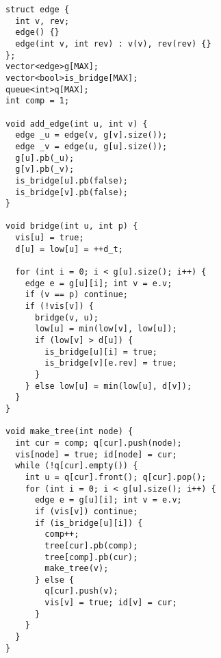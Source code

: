 \documentclass[10pt,a4paper,onesided]{article}
\begin{document}
\begin{multicols*}{3}
\begin{lstlisting}
struct edge {
  int v, rev;
  edge() {}
  edge(int v, int rev) : v(v), rev(rev) {}
};
vector<edge>g[MAX];
vector<bool>is_bridge[MAX];
queue<int>q[MAX];
int comp = 1;

void add_edge(int u, int v) {
  edge _u = edge(v, g[v].size());
  edge _v = edge(u, g[u].size());
  g[u].pb(_u);
  g[v].pb(_v);
  is_bridge[u].pb(false);
  is_bridge[v].pb(false);
}

void bridge(int u, int p) {
  vis[u] = true;
  d[u] = low[u] = ++d_t;

  for (int i = 0; i < g[u].size(); i++) {
    edge e = g[u][i]; int v = e.v;
    if (v == p) continue;
    if (!vis[v]) {
      bridge(v, u);
      low[u] = min(low[v], low[u]);
      if (low[v] > d[u]) {
        is_bridge[u][i] = true;
        is_bridge[v][e.rev] = true;
      }
    } else low[u] = min(low[u], d[v]);
  }
}

void make_tree(int node) {
  int cur = comp; q[cur].push(node);
  vis[node] = true; id[node] = cur;
  while (!q[cur].empty()) {
    int u = q[cur].front(); q[cur].pop();
    for (int i = 0; i < g[u].size(); i++) {
      edge e = g[u][i]; int v = e.v;
      if (vis[v]) continue;
      if (is_bridge[u][i]) {
        comp++;
        tree[cur].pb(comp);
        tree[comp].pb(cur);
        make_tree(v);
      } else {
        q[cur].push(v);
        vis[v] = true; id[v] = cur;
      }
    }
  }
}
\end{lstlisting}

\end{multicols*}
\end{document}
